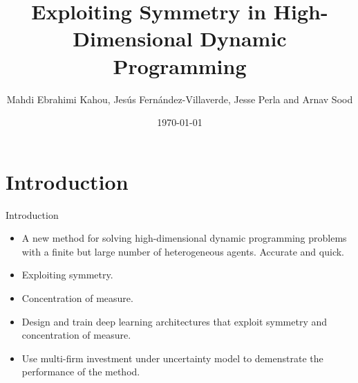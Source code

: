 \documentclass[dvipsnames,mathserif]{beamer}
\begin{document}
\rightskip\rightmargin
\title{Exploiting Symmetry in High-Dimensional Dynamic Programming}
\author{Mahdi Ebrahimi Kahou, Jesús Fernández-Villaverde, Jesse Perla and Arnav Sood}

\footnotesize{\date{\today }


\begin{frame}
\maketitle
\end{frame}


%
\footnotesize \tableofcontents
%
\section{Introduction}
\begin{frame}{Introduction}
    \begin{itemize}
        \item A new method for solving high-dimensional dynamic programming problems with a finite but large number of heterogeneous agents. Accurate and quick.\\
        \vspace{0.2cm}
        \item Exploiting symmetry.
        \vspace{0.2cm}
        \item Concentration of measure.
        \vspace{0.2cm}
        \item Design and train deep learning architectures that exploit symmetry and concentration of measure.
        \item Use multi-firm investment under uncertainty model to demenstrate the performance of the method. 
    \end{itemize}
\end{frame}


}
\end{document}
